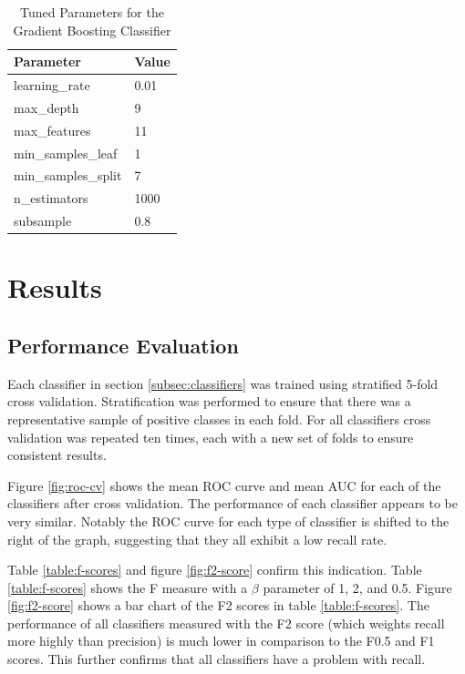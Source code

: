 \documentclass[journal]{IEEEtran}
\begin{document}
\begin{table}
\centering
\caption{Tuned Parameters for the Gradient Boosting Classifier}
\begin{tabular}{|l|l|}
\hline
\textbf{Parameter}                &       \textbf{Value}    \\
\hline
learning\_rate            &      0.01 \\ \hline
max\_depth                &         9 \\ \hline
max\_features             &        11 \\ \hline
min\_samples\_leaf         &         1 \\ \hline
min\_samples\_split        &         7 \\ \hline
n\_estimators             &      1000 \\ \hline
subsample                &       0.8 \\ \hline
\end{tabular}
\label{table:gb-parameters}

\end{table}


\section{Results}
\label{sec:results}

\subsection{Performance Evaluation}
\label{subsec:performance}

Each classifier in section \ref{subsec:classifiers} was trained using stratified 5-fold cross validation. Stratification was performed to ensure that there was a representative sample of positive classes in each fold. For all classifiers cross validation was repeated ten times, each with a new set of folds to ensure consistent results.

Figure \ref{fig:roc-cv} shows the mean ROC curve and mean AUC for each of the classifiers after cross validation. The performance of each classifier appears to be very similar. Notably the ROC curve for each type of classifier is shifted to the right of the graph, suggesting that they all exhibit a low recall rate.

Table \ref{table:f-scores} and figure \ref{fig:f2-score} confirm this indication. Table \ref{table:f-scores} shows the F measure with a $\beta$ parameter of 1, 2, and 0.5. Figure \ref{fig:f2-score} shows a bar chart of the F2 scores in table \ref{table:f-scores}. The performance of all classifiers measured with the F2 score (which weights recall more highly than precision) is much lower in comparison to the F0.5 and F1 scores. This further confirms that all classifiers have a problem with recall.
\end{document}
